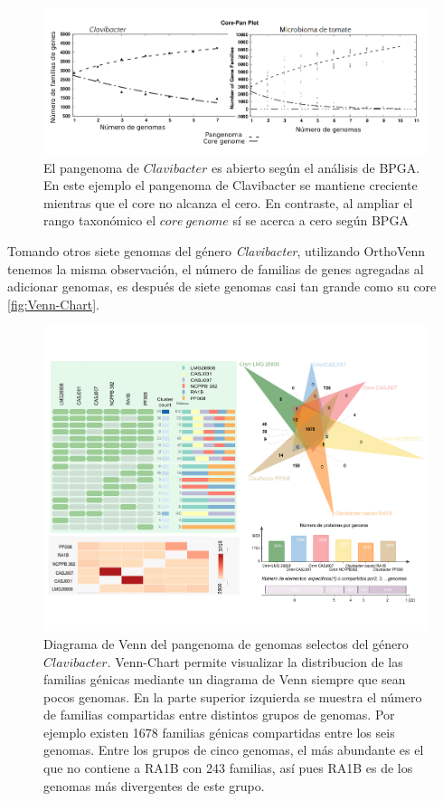 \documentclass[12pt,twoside]{reedthesis}
\begin{document}
  \begin{figure}[h!tbp]
  \centering
  \includegraphics[angle = 0,scale = .5]{chapter1/bpga-pangenoma.png}
  \caption[El pangenoma de $Clavibacter$ es abierto según el análisis de BPGA.]{\footnotesize{El pangenoma de $Clavibacter$ es abierto según el análisis de BPGA. En este ejemplo el pangenoma de Clavibacter se mantiene creciente mientras que el core no alcanza el cero. En contraste, al ampliar el rango taxonómico el $core~genome$ sí se acerca a cero según BPGA}}
  \label{fig:bpga-pangenoma}
  \end{figure}
  
  Tomando otros siete genomas del género \emph{Clavibacter}, utilizando
  OrthoVenn tenemos la misma observación, el número de familias de genes
  agregadas al adicionar genomas, es después de siete genomas casi tan
  grande como su core \autoref{fig:Venn-Chart}.
  
  \begin{figure}[h!tbp]
  \centering
  \includegraphics[angle = 0,scale = .6]{chapter1/Venn_chart.pdf}
  \caption[Diagrama de Venn del pangenoma de genomas selectos del género $Clavibacter$ ]{\footnotesize{Diagrama de Venn del pangenoma de genomas selectos del género $Clavibacter$. Venn-Chart permite visualizar la distribucion de las familias génicas mediante un diagrama de Venn siempre que sean pocos genomas. En la parte superior izquierda se muestra el número de familias compartidas entre distintos grupos de genomas. Por ejemplo existen 1678 familias génicas compartidas entre los seis genomas. Entre los grupos de cinco genomas, el más abundante es el que no contiene a RA1B con 243 familias, así pues RA1B es de los genomas más divergentes de este grupo.}}
  \label{fig:Venn-Chart}
  \end{figure}
  
\end{document}
